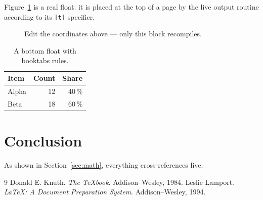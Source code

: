 \documentclass{article}
\begin{document}
Figure~\ref{fig:example} is a real float: it is placed at the top of a
page by the live output routine according to its \texttt{[t]} specifier.

\begin{figure}[t]
\centering
{}
\caption{Edit the coordinates above --- only this block recompiles.}
\label{fig:example}
\end{figure}

\begin{table}[b]
\centering
\begin{tabular}{lrr}
\toprule
Item & Count & Share \\
\midrule
Alpha & 12 & 40\,\% \\
Beta  & 18 & 60\,\% \\
\bottomrule
\end{tabular}
\caption{A bottom float with booktabs rules.}
\label{tab:example}
\end{table}

\section{Conclusion}

As shown in Section~\ref{sec:math}, everything cross-references live.

\begin{thebibliography}{9}
 Donald E. Knuth. \emph{The \TeX book}.
Addison--Wesley, 1984.
 Leslie Lamport. \emph{\LaTeX: A Document
Preparation System}. Addison--Wesley, 1994.
\end{thebibliography}
\end{document}
